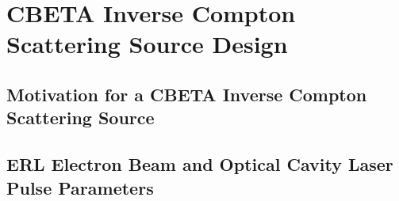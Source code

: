 \documentclass[../main.tex]{subfiles}
\begin{document}
\chapter{CBETA Inverse Compton Scattering Source Design}
\label{CBETA_Inverse_Compton_Scattering_Source_Design} %

\section{Motivation for a CBETA Inverse Compton Scattering Source}

\section{ERL Electron Beam and Optical Cavity Laser Pulse Parameters}
\end{document}
